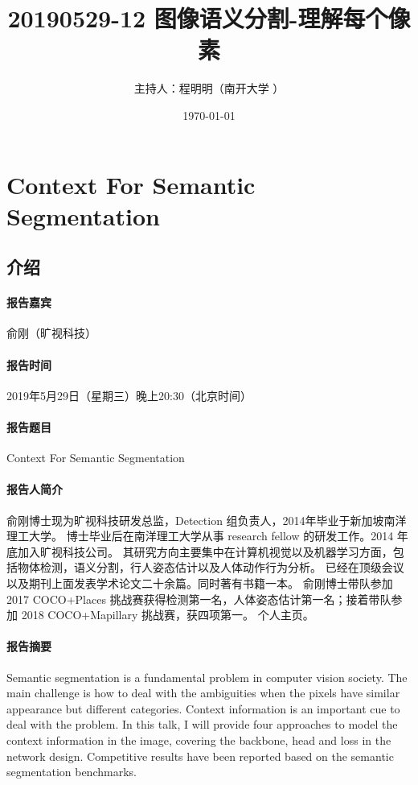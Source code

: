 \documentclass[UTF8]{ctexart}
\begin{document}
\title{20190529-12 图像语义分割-理解每个像素}
\author{主持人：程明明（南开大学 ）}
\date\today
\maketitle
\tableofcontents
\fi
\section{Context For Semantic Segmentation}

\subsection{介绍}
\paragraph{报告嘉宾}
俞刚（旷视科技）

\paragraph{报告时间}
2019年5月29日（星期三）晚上20:30（北京时间）

\paragraph{报告题目}Context For Semantic Segmentation

\paragraph{报告人简介}
俞刚博士现为旷视科技研发总监，Detection 组负责人，2014年毕业于新加坡南洋理工大学。
博士毕业后在南洋理工大学从事 research fellow 的研发工作。2014 年底加入旷视科技公司。
其研究方向主要集中在计算机视觉以及机器学习方面，包括物体检测，语义分割，行人姿态估计以及人体动作行为分析。
已经在顶级会议以及期刊上面发表学术论文二十余篇。同时著有书籍一本。
俞刚博士带队参加 2017 COCO+Places 挑战赛获得检测第一名，人体姿态估计第一名；接着带队参加 2018 COCO+Mapillary 挑战赛，获四项第一。
个人主页\cite{Gangyu}。

\paragraph{报告摘要}
Semantic segmentation is a fundamental problem in computer vision society. 
The main challenge is how to deal with the ambiguities when the pixels have similar appearance but different categories. 
Context information is an important cue to deal with the problem. 
In this talk, I will provide four approaches to model the context information in the image, covering the backbone, head and loss in the network design. 
Competitive results have been reported based on the semantic segmentation benchmarks.
\end{document}
